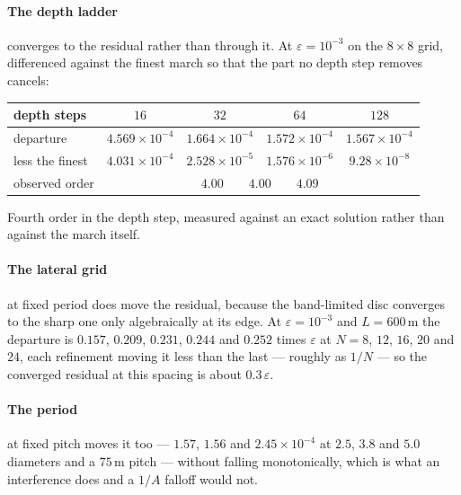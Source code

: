 \documentclass[11pt,a4paper]{article}
\begin{document}
\paragraph{The depth ladder} converges to the residual rather than through it.
At $\varepsilon=10^{-3}$ on the $8\times8$ grid, differenced against the finest
march so that the part no depth step removes cancels:
\begin{center}
\begin{tabular}{@{}lcccc@{}}
\toprule
depth steps & $16$ & $32$ & $64$ & $128$ \\
\midrule
departure            & $4.569\times 10^{-4}$ & $1.664\times 10^{-4}$ & $1.572\times 10^{-4}$
                     & $1.567\times 10^{-4}$ \\
less the finest      & $4.031\times 10^{-4}$ & $2.528\times 10^{-5}$ & $1.576\times 10^{-6}$ & $9.28\times10^{-8}$ \\
observed order       & \multicolumn{4}{c}{$4.00\qquad 4.00\qquad 4.09$} \\
\bottomrule
\end{tabular}
\end{center}
Fourth order in the depth step, measured against an exact solution rather than
against the march itself.

\paragraph{The lateral grid} at fixed period does move the residual, because
the band-limited disc converges to the sharp one only algebraically at its edge.
At $\varepsilon=10^{-3}$ and $L=600$\,m the departure is $0.157$, $0.209$,
$0.231$, $0.244$ and $0.252$ times $\varepsilon$ at $N=8$, $12$, $16$, $20$ and
$24$, each refinement moving it less than the last --- roughly as $1/N$ --- so
the converged residual at this spacing is about $0.3\,\varepsilon$.

\paragraph{The period} at fixed pitch moves it too --- $1.57$, $1.56$ and
$2.45\times10^{-4}$ at $2.5$, $3.8$ and $5.0$ diameters and a $75$\,m pitch ---
without falling monotonically, which is what an interference does and a $1/A$
falloff would not.
\end{document}
